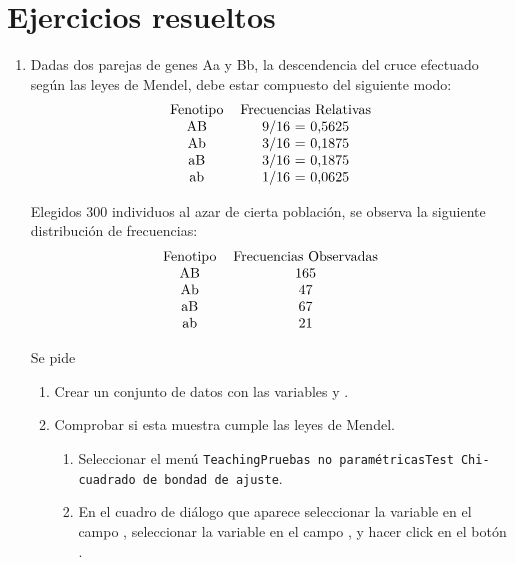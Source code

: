 \clearpage
\newpage

\section{Ejercicios resueltos}
\begin{enumerate}[leftmargin=*]

\item Dadas dos parejas de genes Aa y Bb, la descendencia del cruce efectuado según las leyes de Mendel, debe estar
compuesto del siguiente modo:
\[
\begin{tabular}{ll}
\multicolumn{1}{c}{Fenotipo} & \multicolumn{1}{c}{Frecuencias Relativas} \\
\multicolumn{1}{c}{AB} & \multicolumn{1}{c}{9/16 = 0,5625} \\
\multicolumn{1}{c}{Ab} & \multicolumn{1}{c}{3/16 = 0,1875} \\
\multicolumn{1}{c}{aB} & \multicolumn{1}{c}{3/16 = 0,1875} \\
\multicolumn{1}{c}{ab} & \multicolumn{1}{c}{1/16 = 0,0625} \\
\end{tabular}
\]

Elegidos 300 individuos al azar de cierta población, se observa la siguiente distribución de frecuencias:
\[
\begin{tabular}{ll}
\multicolumn{1}{c}{Fenotipo} & \multicolumn{1}{c}{Frecuencias Observadas} \\
\multicolumn{1}{c}{AB} & \multicolumn{1}{c}{165} \\
\multicolumn{1}{c}{Ab} & \multicolumn{1}{c}{47} \\
\multicolumn{1}{c}{aB} & \multicolumn{1}{c}{67} \\
\multicolumn{1}{c}{ab} & \multicolumn{1}{c}{21} \\
\end{tabular}
\]

Se pide

\begin{enumerate}
\item Crear un conjunto de datos con las variables  y .

\item Comprobar si esta muestra cumple las leyes de Mendel.
\begin{indicacion}{
\begin{enumerate}
\item Seleccionar el menú \texttt{Teaching\flecha Pruebas no paramétricas\flecha Test Chi-cuadrado de bondad de ajuste}.
\item En el cuadro de diálogo que aparece seleccionar la variable  en el campo
, seleccionar la variable  en el campo , y hacer click en el botón .
\end{enumerate}}
\end{indicacion}


\end{enumerate}
\end{enumerate}
